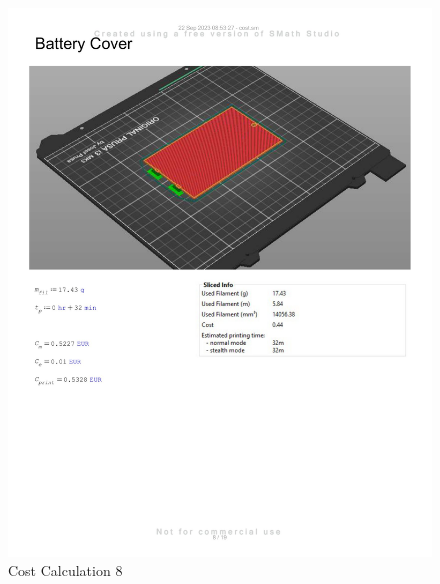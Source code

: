 \begin{figure}[H]
    \centering
    \includegraphics[width=\linewidth]{texs/appendix/data/costcalculation/cost1-08.jpg}
    \caption{Cost Calculation 8}
    \label{fig:cost-calculation-8}
\end{figure}

